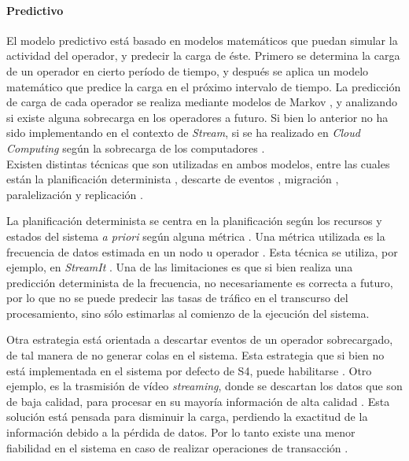 \documentclass[12pt,letterpaper]{article}
\begin{document}
\paragraph{Predictivo}
El modelo predictivo está basado en modelos matemáticos que puedan simular la actividad del operador, y predecir la carga de éste. Primero se determina la carga de un operador en cierto período de tiempo, y después se aplica un modelo matemático que predice la carga en el próximo intervalo de tiempo. La predicción de carga de cada operador se realiza mediante modelos de Markov \cite{GongGW10}, y analizando si existe alguna sobrecarga en los operadores a futuro. Si bien lo anterior no ha sido implementando en el contexto de \textsl{Stream}, si se ha realizado en \textsl{Cloud Computing} según la sobrecarga de los computadores \cite{NguyenSGSW13}.\\

Existen distintas técnicas que son utilizadas en ambos modelos, entre las cuales están la planificación determinista \cite{XuCTS14, DongTS07}, descarte de eventos \cite{SheuC09}, migración \cite{XingZH05}, para\-lelización \cite{GulisanoJPSV12, IshiiS11, GedikSHW14} y replicación \cite{FernandezMKP13}.

La planificación determinista \cite{DongTS07} se centra en la planificación según los recursos y estados del sistema \textsl{a priori} según alguna métrica \cite{XuCTS14}. Una métrica utilizada es la frecuencia de datos estimada en un nodo u operador \cite{Ganguly09}. Esta técnica se utiliza, por ejemplo, en \textsl{StreamIt} \cite{ThiesKA02}. Una de las limitaciones es que si bien realiza una predicción determinista de la frecuencia, no necesariamente es correcta a futuro, por lo que no se puede predecir las tasas de tráfico en el transcurso del procesamiento, sino sólo estimarlas al comienzo de la ejecución del sistema.

Otra estrategia está orientada a descartar eventos de un operador sobrecargado, de tal manera de no generar colas en el sistema. Esta estrategia que si bien no está implementada en el sistema por defecto de S4, puede habilitarse \cite{s4}. Otro ejemplo, es la trasmisión de vídeo \textsl{streaming}, donde se descartan los datos que son de baja calidad, para procesar en su mayoría información de alta calidad \cite{SheuC09}. Esta solución está pensada para disminuir la carga, perdiendo la exactitud de la información debido a la pérdida de datos. Por lo tanto existe una menor fiabilidad en el sistema en caso de realizar operaciones de transacción \cite{bookDistrSys}.
\end{document}
